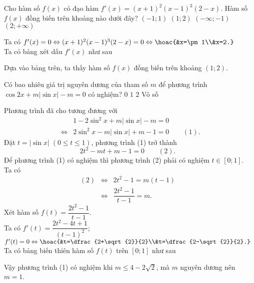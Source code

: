 \begin{ex}%
	Cho hàm số $f(x)$ có đạo hàm $f'(x)=(x+1)^2(x-1)^3(2-x)$. Hàm số $f(x)$ đồng biến trên khoảng nào dưới đây?
 	\choice
	{$(-1;1)$}
	{\True $(1;2)$}
	{$(-\infty;-1)$}
	{$(2;+\infty)$}
	\loigiai
	{
		Ta có $f'(x)=0\Leftrightarrow (x+1)^2(x-1)^3(2-x)=0 \Leftrightarrow \hoac{&x=\pm1\\&x=2.}$\\
		Ta có bảng xét dấu $f'(x)$ như sau
		\begin{center}
		\end{center}
		Dựa vào bảng trên, ta thấy hàm số $f(x)$ đồng biến trên khoảng $(1;2)$.
	}
\end{ex}

\begin{ex}%
	Có bao nhiêu giá trị nguyên dương của tham số $m$ để phương trình $\cos 2x+m|\sin x|-m=0$ có nghiệm? 
	\choice
	{$0$}
	{\True $1$}
	{$2$}
	{Vô số}
	\loigiai
	{
		Phương trình đã cho tương đương với 
		\begin{eqnarray*}
			& & 1-2\sin^2 x+m|\sin x|-m=0\\
			& \Leftrightarrow &2\sin^2 x-m|\sin x|+m-1=0\qquad (1). 
		\end{eqnarray*}\vspace{-3ex}
	Đặt $t=|\sin x|$ $(0\le t\le 1)$, phương trình (1) trở thành 
	$$2t^2-mt+m-1=0\qquad(2).$$
	Để phương trình (1) có nghiệm thì phương trình (2) phải có nghiệm $t\in[0;1]$.\\
	Ta có \vspace{-3ex}
	\begin{eqnarray*}
		(2) & \Leftrightarrow & 2t^2-1=m(t-1)\\
		& \Leftrightarrow & \dfrac{2t^2-1}{t-1}=m.
	\end{eqnarray*}\vspace{-3ex}
	Xét hàm số $f(t)=\dfrac{2t^2-1}{t-1}$.\\
	Ta có $f'(t)=\dfrac{2t^2-4t+1}{(t-1)^2}$; $f'(t)=0 \Leftrightarrow \hoac{&t=\dfrac{2+\sqrt{2}}{2}\\&t=\dfrac{2-\sqrt{2}}{2}.}$\\
	Ta có bảng biến thiên hàm số $f(t)$ trên $[0;1]$ như sau
	\begin{center}
	\end{center}
	Vậy phương trình (1) có nghiệm khi $m\le4-2\sqrt{2}$, mà $m$ nguyên dương nên $m=1$.
	}
\end{ex}

